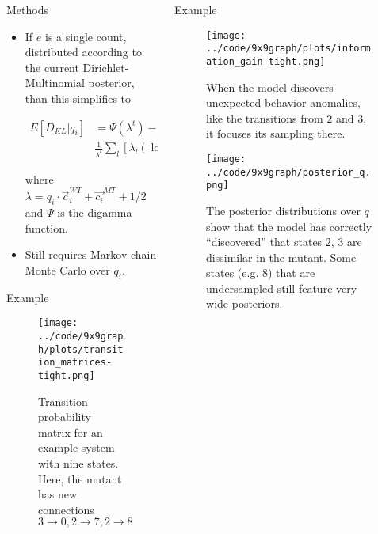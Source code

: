 \documentclass[final]{beamer}
\begin{document}
\begin{frame}{}
\begin{columns}[t]
\begin{column}{.3\linewidth}
\begin{block}{Methods}
\begin{itemize}
\item If $e$ is a single count, distributed according to the current Dirichlet-Multinomial posterior, than this simplifies to

\begin{align*}
E[D_{KL} \vert q_i] &= \Psi(\lambda^t) - \log(\lambda^t) + \\
 &\frac{1}{\lambda^t} \sum_l \left[ \lambda_l \left( \log (\lambda_l) - \Psi(\lambda_l) \right) \right] 
\end{align*}

where $\lambda = q_i \cdot \vec{c}_i^{WT} + \vec{c_i}^{MT} + 1/2$ and $\Psi$ is the digamma function.

\item Still requires Markov chain Monte Carlo over $q_i$.

\end{itemize}
\end{block}
\vspace{0.5in}


\begin{block}{Example}
\end{block}

\begin{figure}
    \centering
 \texttt{[image: ../code/9x9graph/plots/transition\_matrices-tight.png]}
    \caption{Transition probability matrix for an example system with nine states. Here, the mutant has new connections $3\rightarrow 0, 2\rightarrow 7, 2\rightarrow 8$}
\end{figure}



\end{column}
\begin{column}{.3\linewidth}

\begin{block}{Example}
\end{block}

\begin{figure}
 \texttt{[image: ../code/9x9graph/plots/information\_gain-tight.png]}
    \caption{When the model discovers unexpected behavior anomalies, like the transitions from $2$ and $3$, it focuses its sampling there.}
\end{figure}

\begin{figure}
 \texttt{[image: ../code/9x9graph/posterior\_q.png]}
    \caption{The posterior distributions over $q$ show that the model has correctly ``discovered'' that states $2$, $3$ are dissimilar in the mutant. Some states (e.g. $8$) that are undersampled still feature very wide posteriors.}
\end{figure}


\end{column}
\end{columns}
\end{frame}
\end{document}
